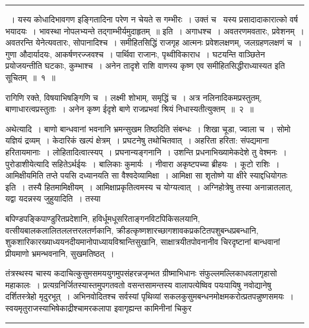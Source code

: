\documentclass[11pt, openany]{book}
\begin{document}
\vspace{2mm}
\hrule

{~। यस्य कोधादिभावगण इङ्गितादिना परेण न चेयते स गम्भीरः~। उक्तं च \textendash\ {\qt यस्य प्रसादादाकारात्को वर्ष भयादयः~। भावस्था नोपलभ्यन्ते तद्गाम्भीर्यमुदाहृतम्~॥} इति~। अगाधश्च~। अवतरणमवतारः, प्रवेशनम्~। अवतरन्ति येनेत्यवतारः, सोपानादिश्च~। समीहितसिद्धिं राजगृह आत्मनः प्रवेशलक्षणम्, जलग्रहणलक्षणं च~। गुणा औदार्यादयः, आकर्षणरज्जवश्च~। पार्थिवा राजानः, पृथ्वीविकाराध~। घटयन्ति वाञ्छितेन प्रयोजयन्तीति घटकाः, कुम्भाश्च~। अनेन तादृशे राशि वाणस्य कृष्ण एव समीहितसिद्धीराध्यास्यत इति सूचितम्~॥~१~॥

रागिणि रक्ते, विषयाभिषङ्गिणि च~। लक्ष्मी शोभाम्, समृद्धिं च~। अत्र नलिनादिकमप्रस्तुतम्, बाणाधारत्वप्रस्तुताः~। अनेन कृष्ण ईदृशे बाणे राजप्रभवां श्रियं निधास्यतीत्युक्तम्~॥~२~॥

{\qtt अथेत्यादि}~। बाणो बान्धवानां भवनानि भ्रमन्सुखम तिष्ठदिति संबन्धः~। शिखा चूडा, ज्वाला च~। सोमो यज्ञियं द्रव्यम्~। केदारिकं खल्पं क्षेत्रम्~। प्रघटनेषु तथोचितवात्~। अहरिता हरिता: संपद्यमाना हरितायमानाः~। लोहितादित्वात्स्यप्~। प्रघनान्यङ्गनानि~। {\qt उशन्ति प्रधनाभिख्यामेकदेशे तु वेश्मनः}~। पुरोडाशीयेत्यादि सहितेऽर्थईयः~। बालिकाः कुमार्यः~। नीवारा अकृष्टपच्या ब्रीहयः~। कूटो राशिः~। आमिक्षीयमिति तप्ते पयसि दध्यानयति सा वैश्वदेव्यामिक्षा~। {\qt आमिक्षा सा शृतोष्णे या क्षीरे स्याद्दधियोगतः} इति~। तस्यै हितमामिक्षीयम्~। आमिक्षाप्रकृतित्वमस्य च योग्यत्वात्~। अग्निहोत्रेषु तस्या अनान्नातलात्, यद्वा यदन्नस्य जुहुयादिति~। तस्या}

\newpage
{}

\noindent
बपिण्डपङ्किपाण्डुरितप्रदेशानि, हविर्धूमधूसरिताङ्गनविटपिकिसलयानि, वत्सीयबालकलालितललत्तरलतर्णकानि, क्रीडत्कृष्णशारच्छागशावकप्रकटितपशुबन्धप्रबन्धानि, शुकशारिकारख्याध्ययनदीयमानोपाध्यायविश्रान्तिसुखानि, साक्षात्रयीतपोवनानीव चिरदृष्टानां बान्धवानां प्रीयमाणो भ्रमन्भवनानि, सुखमतिष्ठत्~।

तंत्रस्थस्य चास्य कदाचित्कुसुमसमययुगमुपसंहरन्नजृम्भत ग्रीष्माभिधानः संफुल्लमल्लिकाधवलागृहासो महाकालः~। प्रत्यग्रनिर्जितस्यास्तमुपगतवतो वसन्तसामन्तस्य वालापत्येष्विव पयःपायिषु नवोद्यानेषु दर्शितस्त्रेहो मृदुरभूत्~। अभिनवोदितश्च सर्वस्यां पृथिव्यां सकलकुसुमबन्धनमोक्षमकरोत्प्रतपन्नुष्णसमयः~। स्वयमृतुराजस्याभिषेकाद्रीश्चामरकलापा इवागृह्यन्त कामिनीनां चिकुर\textendash

\vspace{2mm}
\hrule
\end{document}
